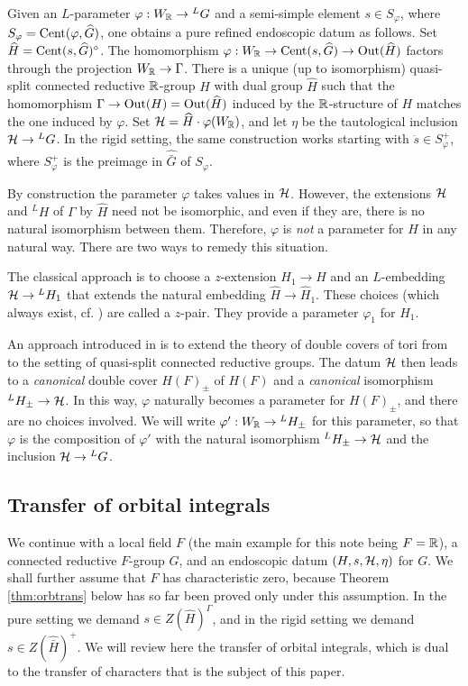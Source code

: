 \documentclass{article}
\theoremstyle{definition}
\numberwithin{equation}{section}
\renewcommand{\-}{\hyp{}}
\begin{document}
Given an $L$\-parameter $\varphi : W_{\mathbb{R}} \to {^LG}$ and a semi-simple element $s \in S_\varphi$, where $S_\varphi=\textrm{Cent}(\varphi,\widehat G)$, one obtains a pure refined endoscopic datum as follows. Set $\widehat H = \textrm{Cent}(s,\widehat G)^\circ$. The homomorphism  $\varphi : W_{\mathbb{R}} \to \textrm{Cent}(s,\widehat G) \to \textrm{Out}(\widehat H)$ factors through the projection $W_{\mathbb{R}} \to \Gamma$. There is a unique (up to isomorphism) quasi-split connected reductive $\mathbb{R}$-group $H$ with dual group $\hat H$ such that the homomorphism $\Gamma \to \textrm{Out}(H)=\textrm{Out}(\widehat H)$ induced by the $\mathbb{R}$-structure of $H$ matches the one induced by $\varphi$. Set $\mathcal{H}=\widehat H \cdot \varphi(W_{\mathbb{R}})$, and let $\eta$ be the tautological inclusion $\mathcal{H} \to {^LG}$. In the rigid setting, the same construction works starting with $\dot s \in S_\varphi^+$, where $S_\varphi^+$ is the preimage in $\hat{\bar G}$ of $S_\varphi$.  

By construction the parameter $\varphi$ takes values in $\mathcal{H}$. However, the extensions $\mathcal{H}$ and $^LH$ of $\Gamma$ by $\hat H$ need not be isomorphic, and even if they are, there is no natural isomorphism between them. Therefore, $\varphi$ is \emph{not} a parameter for $H$ in any natural way. There are two ways to remedy this situation.

The classical approach is to choose a $z$-extension $H_1 \to H$ and an $L$\-embedding $\mathcal{H} \to {^LH_1}$ that extends the natural embedding $\hat H \to \hat H_1$. These choices (which always exist, cf. \cite[\S2.2]{KS99}) are called a $z$-pair. They provide a parameter $\varphi_1$ for $H_1$.

An approach introduced in \cite{KalHDC} is to extend the theory of double covers of tori from \cite{KalDC} to the setting of quasi-split connected reductive groups. The datum $\mathcal{H}$ then leads to a \emph{canonical} double cover $H(F)_\pm$ of $H(F)$ and a \emph{canonical} isomorphism $^LH_\pm \to \mathcal{H}$. In this way, $\varphi$ naturally becomes a parameter for $H(F)_\pm$, and there are no choices involved. We will write $\varphi' : W_{\mathbb{R}} \to {^LH_\pm}$ for this parameter, so that $\varphi$ is the composition of $\varphi'$ with the natural isomorphism $^LH_\pm \to \mathcal{H}$ and the inclusion $\mathcal{H} \to {^LG}$.

\subsection{Transfer of orbital integrals} \label{sub:transfer}

We continue with a local field $F$ (the main example for this note being $F=\mathbb{R}$), a connected reductive $F$-group $G$, and an endoscopic datum $(H,s,\mathcal{H},\eta)$ for $G$. We shall further assume that $F$ has characteristic zero, because Theorem \ref{thm:orbtrans} below has so far been proved only under this assumption. In the pure setting we demand $s \in Z(\hat H)^\Gamma$, and in the rigid setting we demand $s \in Z(\hat{\bar H})^+$. We will review here the transfer of orbital integrals, which is dual to the transfer of characters that is the subject of this paper.
\end{document}
